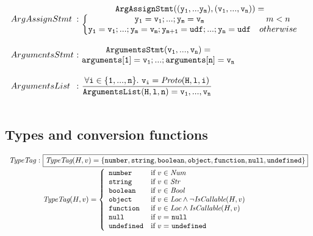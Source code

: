 \documentclass[a4paper, leqno]{amsart}
\def\inred{\color{red}}
\newcommand{\nullK}{{\tt null}}
\newcommand{\undef}{{\tt undefined}}
\newcommand{\bool}{\emph{Bool}}
\newcommand{\val}{\emph{Val}}
\newcommand{\loc}{\emph{Loc}}
\newcommand{\str}{\emph{Str}}
\newcommand{\num}{\emph{Num}}
\begin{document}
{{\inred
\[
\begin{array}{l@{}l@{}ll}   

ArgAssignStmt & \ : \ & 
    \begin{matrix}
       {\tt ArgAssignStmt((y_1,...y_m),(v_1,...,v_n)) =}\\
         \left\{\begin{matrix}
           {\tt y_1=v_1;...;y_m=v_m} & m < n\\ 
           {\tt y_1=v_1;...;y_m=v_m;y_{m+1}=udf;...;y_n=udf} & otherwise
         \end{matrix}\right.
    \end{matrix} & \\
 & & \\

ArgumentsStmt & \ : \ &
    \begin{matrix}
       {\tt ArgumentsStmt(v_1,...,v_n) =}\\
       {\tt arguments[1] = v_1;...;arguments[n] = v_n}
    \end{matrix} & \\
 & & \\
    
ArgumentsList & \ : \ & \frac{
    \begin{matrix}
       {\tt \forall i \in \{1,...,n\}.\ v_i =\emph{Proto}(H,l,i)}
    \end{matrix}}{
    \begin{matrix}
       {\tt ArgumentsList(H,l,n) = v_1, ..., v_n}
    \end{matrix}}& \\
 & & \\

\end{array}
\]
}

\subsection{Types and conversion functions}
\[
\begin{array}{l@{}l@{}ll}
\emph{TypeTag} & \ : \ & \fbox{$\emph{TypeTag}(H,v)=\{{\tt number,string,boolean,object,function,null,undefined}\}$}\\[.5em]
&&
\emph{TypeTag}(H,v) = \left\{ \begin{array}{ll}
{\tt number} &\mbox{if $v\in\num$}\\
{\tt string} &\mbox{if $v\in\str$}\\
{\tt boolean} &\mbox{if $v\in\bool$}\\
{\tt object} &\mbox{if $v \in \loc \wedge \neg \emph{IsCallable}(H,v)$}\\
{\tt function} &\mbox{if $v \in \loc \wedge \emph{IsCallable}(H,v)$}\\
{\tt null}& \mbox{if $v=$ \nullK}\\
{\tt undefined}& \mbox{if $v=$ \undef}
\end{array}
\right.
\\\\


\end{array}\]}
\end{document}
